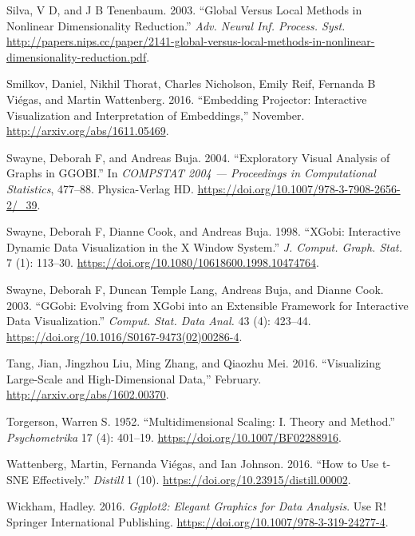\documentclass[article,notitle]{jdssv}
\begin{document}
\leavevmode\hypertarget{ref-Silva2003-xw}{}%
Silva, V D, and J B Tenenbaum. 2003. ``Global Versus Local Methods in Nonlinear Dimensionality Reduction.'' \emph{Adv. Neural Inf. Process. Syst.} \url{http://papers.nips.cc/paper/2141-global-versus-local-methods-in-nonlinear-dimensionality-reduction.pdf}.

\leavevmode\hypertarget{ref-Smilkov2016-hp}{}%
Smilkov, Daniel, Nikhil Thorat, Charles Nicholson, Emily Reif, Fernanda B Viégas, and Martin Wattenberg. 2016. ``Embedding Projector: Interactive Visualization and Interpretation of Embeddings,'' November. \url{http://arxiv.org/abs/1611.05469}.

\leavevmode\hypertarget{ref-Swayne2004-ua}{}%
Swayne, Deborah F, and Andreas Buja. 2004. ``Exploratory Visual Analysis of Graphs in GGOBI.'' In \emph{COMPSTAT 2004 --- Proceedings in Computational Statistics}, 477--88. Physica-Verlag HD. \url{https://doi.org/10.1007/978-3-7908-2656-2/_39}.

\leavevmode\hypertarget{ref-Swayne1998-uq}{}%
Swayne, Deborah F, Dianne Cook, and Andreas Buja. 1998. ``XGobi: Interactive Dynamic Data Visualization in the X Window System.'' \emph{J. Comput. Graph. Stat.} 7 (1): 113--30. \url{https://doi.org/10.1080/10618600.1998.10474764}.

\leavevmode\hypertarget{ref-Swayne2003-qd}{}%
Swayne, Deborah F, Duncan Temple Lang, Andreas Buja, and Dianne Cook. 2003. ``GGobi: Evolving from XGobi into an Extensible Framework for Interactive Data Visualization.'' \emph{Comput. Stat. Data Anal.} 43 (4): 423--44. \url{https://doi.org/10.1016/S0167-9473(02)00286-4}.

\leavevmode\hypertarget{ref-Tang2016-oz}{}%
Tang, Jian, Jingzhou Liu, Ming Zhang, and Qiaozhu Mei. 2016. ``Visualizing Large-Scale and High-Dimensional Data,'' February. \url{http://arxiv.org/abs/1602.00370}.

\leavevmode\hypertarget{ref-Torgerson1952-am}{}%
Torgerson, Warren S. 1952. ``Multidimensional Scaling: I. Theory and Method.'' \emph{Psychometrika} 17 (4): 401--19. \url{https://doi.org/10.1007/BF02288916}.

\leavevmode\hypertarget{ref-Wattenberg2016-ji}{}%
Wattenberg, Martin, Fernanda Viégas, and Ian Johnson. 2016. ``How to Use t-SNE Effectively.'' \emph{Distill} 1 (10). \url{https://doi.org/10.23915/distill.00002}.

\leavevmode\hypertarget{ref-Wickham2016-gz}{}%
Wickham, Hadley. 2016. \emph{Ggplot2: Elegant Graphics for Data Analysis}. Use R! Springer International Publishing. \url{https://doi.org/10.1007/978-3-319-24277-4}.
\end{document}
